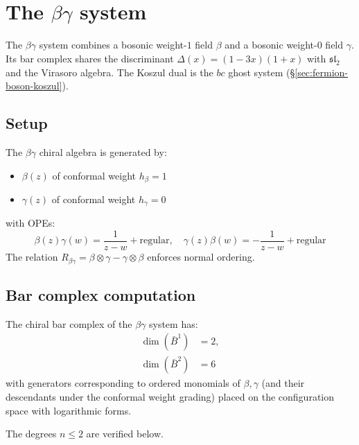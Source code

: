 \section{\texorpdfstring{The $\beta\gamma$ system}{The system}}

The $\beta\gamma$ system combines a bosonic weight-$1$ field $\beta$ and a bosonic weight-$0$ field $\gamma$.  Its bar complex shares the discriminant $\Delta(x) = (1-3x)(1+x)$ with $\widehat{\mathfrak{sl}}_2$ and the Virasoro algebra.  The Koszul dual is the $bc$ ghost system (\S\ref{sec:fermion-boson-koszul}).
 
\subsection{Setup}
 
\begin{definition}
The $\beta\gamma$ chiral algebra is generated by:
\begin{itemize}
\item $\beta(z)$ of conformal weight $h_\beta = 1$
\item $\gamma(z)$ of conformal weight $h_\gamma = 0$
\end{itemize}
with OPEs:
\[
\beta(z)\gamma(w) = \frac{1}{z-w} + \text{regular}, \quad 
\gamma(z)\beta(w) = -\frac{1}{z-w} + \text{regular}
\]
The relation $R_{\beta\gamma} = \beta \otimes \gamma - \gamma \otimes \beta$ enforces normal ordering.
\end{definition}

\subsection{Bar complex computation}

\begin{theorem}\label{thm:betagamma-bar-complex}
The chiral bar complex of the $\beta\gamma$ system has:
\begin{align}
\dim(\bar{B}^1) &= 2, \\
\dim(\bar{B}^2) &= 6
\end{align}
with generators corresponding to ordered monomials of $\beta, \gamma$ (and their descendants under the conformal weight grading) placed on the configuration space with logarithmic forms.

The degrees $n \leq 2$ are verified below.
\end{theorem}

